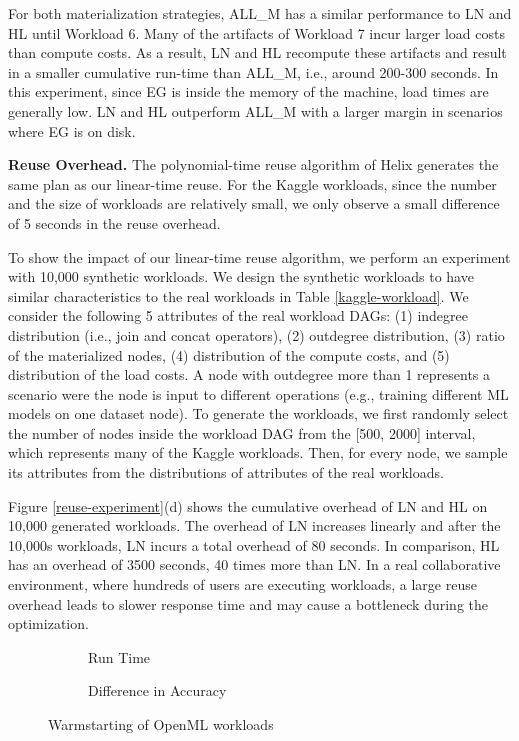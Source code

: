 For both materialization strategies, ALL\_M has a similar performance to LN and HL until Workload 6.
Many of the artifacts of Workload 7 incur larger load costs than compute costs.
As a result, LN and HL recompute these artifacts and result in a smaller cumulative run-time than ALL\_M, i.e., around 200-300 seconds.
In this experiment, since EG is inside the memory of the machine, load times are generally low.
LN and HL outperform ALL\_M with a larger margin in scenarios where EG is on disk.

\textbf{Reuse Overhead.} 
The polynomial-time reuse algorithm of Helix generates the same plan as our linear-time reuse.
For the Kaggle workloads, since the number and the size of workloads are relatively small, we only observe a small difference of 5 seconds in the reuse overhead. 

To show the impact of our linear-time reuse algorithm, we perform an experiment with 10,000 synthetic workloads.
We design the synthetic workloads to have similar characteristics to the real workloads in Table \ref{kaggle-workload}.
We consider the following 5 attributes of the real workload DAGs: (1) indegree distribution (i.e., join and concat operators), (2) outdegree distribution, (3) ratio of the materialized nodes, (4) distribution of the compute costs, and (5) distribution of the load costs.
A node with outdegree more than 1 represents a scenario were the node is input to different operations (e.g., training different ML models on one dataset node).
To generate the workloads, we first randomly select the number of nodes inside the workload DAG from the [500, 2000] interval, which represents many of the Kaggle workloads.
Then, for every node, we sample its attributes from the distributions of attributes of the real workloads.

Figure \ref{reuse-experiment}(d) shows the cumulative overhead of LN and HL on 10,000 generated workloads.
The overhead of LN increases linearly and after the 10,000s workloads, LN incurs a total overhead of 80 seconds.
In comparison, HL has an overhead of 3500 seconds, 40 times more than LN.
In a real collaborative environment, where hundreds of users are executing workloads, a large reuse overhead leads to slower response time and may cause a bottleneck during the optimization.
\begin{figure}[t]
\begin{subfigure}[b]{0.5\linewidth}
\centering
 \resizebox{\columnwidth}{!}{%
%
}
\caption{Run Time}
\end{subfigure}%
\begin{subfigure}[b]{0.5\linewidth}
\centering
 \resizebox{\columnwidth}{!}{%
%
}
\caption{Difference in Accuracy}
\end{subfigure}
\caption{Warmstarting of OpenML workloads}
\label{exp-model-warmstarting}
\vspace{-8mm}
\end{figure}

